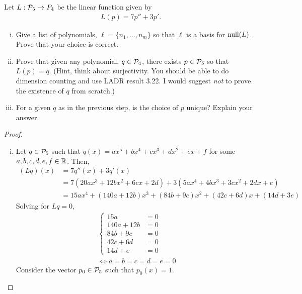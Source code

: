 \begin{question}
	\normalfont
	
	
	
	
	Let $L:\P_5\to P_4$ be the linear function given by 
	\begin{align*}
		L(p) = 7p'' + 3p'.
	\end{align*}
	\begin{enumerate}[(i)]
		\item Give a list of polynomials, $\ell = \{n_1,\dots, n_m\}$ so that $\ell$ is a basis for $\NullLA(L)$.  Prove that your choice is correct.
		
		
		\item Prove that given any polynomial, $q\in \P_4$, there exists $p\in\P_5$ so that $L(p)=q$.  (Hint, think about surjectivity. You should be able to do dimension counting and use LADR result 3.22.  I would suggest \emph{not} to prove the existence of $q$ from scratch.)
		
		\item For a given $q$ as in the previous step, is the choice of $p$ unique?  Explain your answer.
		
	\end{enumerate}
\end{question}

\begin{proof}
    \renewcommand{\qedsymbol}{$\blacksquare$}
    \begin{enumerate}[(i)]
        \item Let $q\in\P_5$ such that $q(x)=ax^5+bx^4+cx^3+dx^2+ex+f$ for some $a,b,c,d,e,f\in\R$.
        Then, 
        \[
            \begin{aligned}
                (Lq)(x)
                &= 7q''(x)+3q'(x)\\
                &= 7(20ax^3+12bx^2+6cx+2d)+3(5ax^4+4bx^3+3cx^2+2dx+e)\\
                &= 15ax^4+(140a+12b)x^3+(84b+9c)x^2+(42c+6d)x+(14d+3e)
            \end{aligned}
        \]
        Solving for $Lq=0$,
        \begin{align*}
            \begin{cases}
                15a &= 0\\
                140a+12b &= 0\\
                84b+9c &= 0\\
                42c+6d &= 0\\
                14d+e &= 0
            \end{cases}\\\iff
            a=b=c=d=e=0
        \end{align*}
        Consider the vector $p_0\in\P_5$ such that $p_0(x)=1$.

    \end{enumerate}
\end{proof}